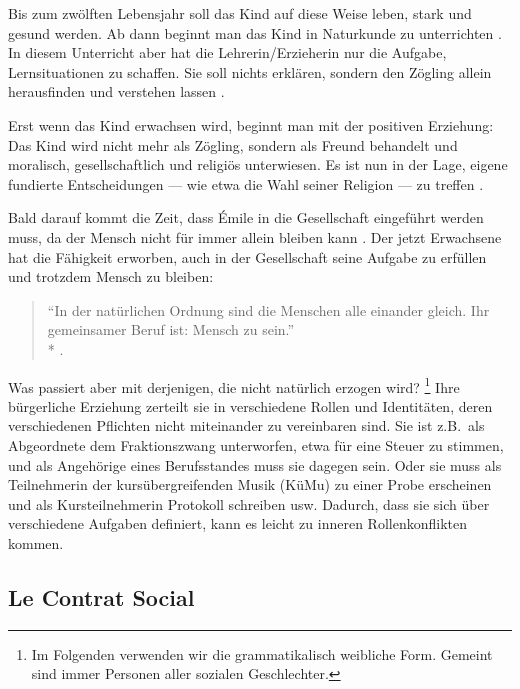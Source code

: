 Bis zum zwölften Lebensjahr soll das Kind auf diese Weise leben, stark und gesund werden.
Ab dann beginnt man das Kind in Naturkunde zu unterrichten \parencite[55]{rousseau-1762}.
In diesem Unterricht aber hat die Lehrerin/Erzieherin nur die Aufgabe, Lernsituationen zu schaffen.
Sie soll nichts erklären, sondern den Zögling allein herausfinden und verstehen lassen \parencite[56]{rousseau-1762}.

Erst wenn das Kind erwachsen wird, beginnt man mit der positiven Erziehung:
Das Kind wird nicht mehr als Zögling, sondern als Freund behandelt und moralisch, gesellschaftlich und religiös unterwiesen.
Es ist nun in der Lage, eigene fundierte Entscheidungen --- wie etwa die Wahl seiner Religion --- zu treffen \parencite[60f.]{rousseau-1762}.

Bald darauf kommt die Zeit, dass Émile in die Gesellschaft eingeführt werden muss, da der Mensch nicht für immer allein bleiben kann \parencite[61]{rousseau-1762}.
Der jetzt Erwachsene hat die Fähigkeit erworben, auch in der Gesellschaft seine Aufgabe zu erfüllen und trotzdem Mensch zu bleiben:

\begin{quote}
	``In der natürlichen Ordnung sind die Menschen alle einander gleich.
	Ihr gemeinsamer Beruf ist: Mensch zu sein.''\\*
	\parencite[50]{rousseau-1762}.
\end{quote}

Was passiert aber mit derjenigen, die nicht natürlich erzogen wird?
\footnote{
	Im Folgenden verwenden wir die grammatikalisch weibliche Form.
	Gemeint sind immer Personen aller sozialen Geschlechter.
}
Ihre bürgerliche Erziehung zerteilt sie in verschiedene Rollen und Identitäten, deren verschiedenen Pflichten nicht miteinander zu vereinbaren sind.
Sie ist z.B.\ als Abgeordnete dem Fraktionszwang unterworfen, etwa für eine Steuer zu stimmen, und als Angehörige eines Berufsstandes muss sie dagegen sein.
Oder sie muss als Teilnehmerin der kursübergreifenden Musik (KüMu) zu einer Probe erscheinen und als Kursteilnehmerin Protokoll schreiben usw.
Dadurch, dass sie sich über verschiedene Aufgaben definiert, kann es leicht zu inneren Rollenkonflikten kommen.


\subsection{Le Contrat Social}

